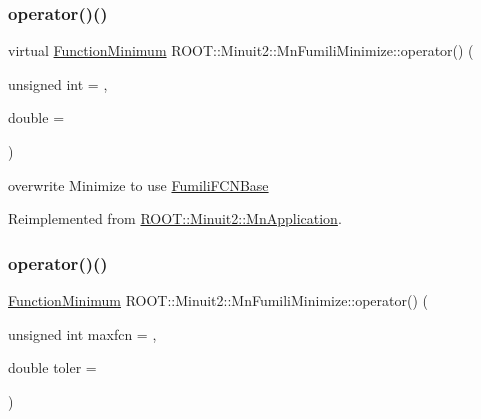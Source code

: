 \subsubsection{\texorpdfstring{operator()()}{operator()()}\hspace{0.1cm}{\footnotesize\ttfamily [1/3]}}
{\footnotesize\ttfamily virtual \mbox{\hyperlink{classROOT_1_1Minuit2_1_1FunctionMinimum}{Function\+Minimum}} R\+O\+O\+T\+::\+Minuit2\+::\+Mn\+Fumili\+Minimize\+::operator() (\begin{DoxyParamCaption}\item[{unsigned int}]{ = {},  }\item[{double}]{ = {} }\end{DoxyParamCaption})\hspace{0.3cm}{\ttfamily [virtual]}}



overwrite Minimize to use \mbox{\hyperlink{classROOT_1_1Minuit2_1_1FumiliFCNBase}{Fumili\+F\+C\+N\+Base}} 



Reimplemented from \mbox{\hyperlink{classROOT_1_1Minuit2_1_1MnApplication_a8908d50d5d4f7f011b94bd10e51eacf7}{R\+O\+O\+T\+::\+Minuit2\+::\+Mn\+Application}}.

\mbox{\label{classROOT_1_1Minuit2_1_1MnFumiliMinimize_a408e4cc7d16335d7a9bfbb8765acec6d}} 
\subsubsection{\texorpdfstring{operator()()}{operator()()}\hspace{0.1cm}{\footnotesize\ttfamily [2/3]}}
{\footnotesize\ttfamily \mbox{\hyperlink{classROOT_1_1Minuit2_1_1FunctionMinimum}{Function\+Minimum}} R\+O\+O\+T\+::\+Minuit2\+::\+Mn\+Fumili\+Minimize\+::operator() (\begin{DoxyParamCaption}\item[{unsigned int}]{maxfcn = {},  }\item[{double}]{toler = {} }\end{DoxyParamCaption})\hspace{0.3cm}{\ttfamily [virtual]}}



